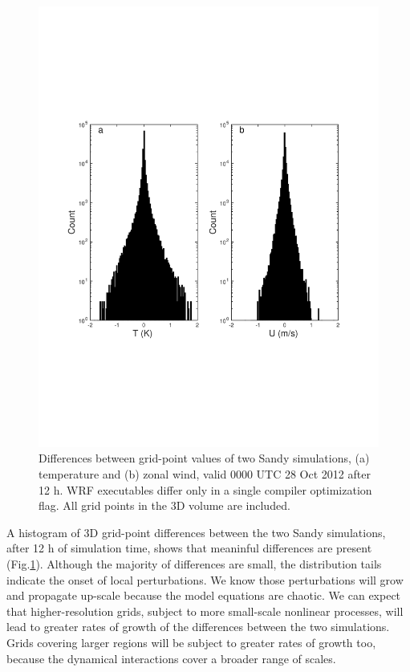 \documentclass[final]{ametsoc}
\begin{document}
\begin{figure}
\begin{center}
\includegraphics[clip,viewport=50 180 600 690,scale=.6]{figures/Fig03.pdf}
\caption{\label{Fig:Diffs} Differences between grid-point values of two Sandy simulations, (a) temperature and (b) zonal wind, valid 0000 UTC 28 Oct 2012 after 12 h. WRF executables differ only in a single compiler optimization flag. All grid points in the 3D volume are included. }
\end{center}
\end{figure}

A histogram of 3D grid-point differences between the two Sandy simulations, after 12 h of simulation time, shows that meaninful differences are present (Fig.\@ \ref{Fig:Diffs}). Although the majority of differences are small, the distribution tails indicate the onset of local perturbations. We know those perturbations will grow and propagate up-scale because the model equations are chaotic.  We can expect that higher-resolution grids, subject to more small-scale nonlinear processes, will lead to greater rates of growth of the differences between the two simulations.  Grids covering larger regions will be subject to greater rates of growth too, because the dynamical interactions cover a broader range of scales.
\end{document}

